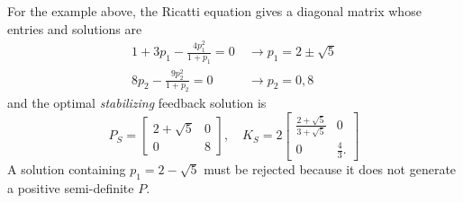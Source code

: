 For the example above, the Ricatti equation gives a diagonal matrix whose entries and solutions are
\begin{align*}
  1 + 3p_1 - \frac{4p_1^2}{1+p_1} = 0\ &\rightarrow p_1 = 2\pm \sqrt{5} \\
  8p_2 - \frac{9p_2^2}{1+p_2} = 0\ &\rightarrow p_2 = 0, 8
\end{align*}
and the optimal \emph{stabilizing} feedback solution is
\begin{equation*}
  P_S =
  \begin{bmatrix}
    2 + \sqrt{5} & 0 \\ 0 & 8
  \end{bmatrix},\quad K_S =
  2\begin{bmatrix}
    \frac{2+\sqrt{5}}{3+\sqrt{5}} & 0 \\ 0 & \frac{4}{3}.
  \end{bmatrix}
\end{equation*}
A solution containing $p_1=2-\sqrt{5}$ must be rejected because it does not generate a positive semi-definite $P$.


